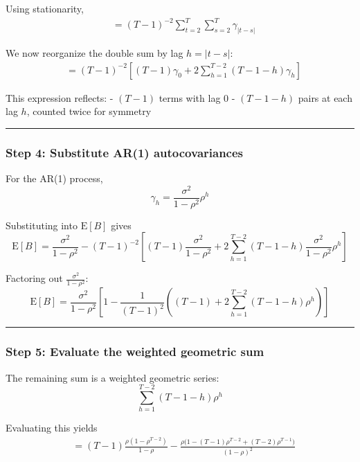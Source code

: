 \documentclass[11pt]{article}
\begin{document}
Using stationarity, \[
\begin{aligned}
&= (T-1)^{-2}\sum_{t=2}^{T}\sum_{s=2}^{T} \gamma_{|t-s|}
\end{aligned}
\]

We now reorganize the double sum by lag \(h = |t-s|\): \[
\begin{aligned}
&= (T-1)^{-2}\left[(T-1)\gamma_0 + 2\sum_{h=1}^{T-2}(T-1-h)\gamma_h\right]
\end{aligned}
\]

This expression reflects: - \((T-1)\) terms with lag 0 - \((T-1-h)\)
pairs at each lag \(h\), counted twice for symmetry

\begin{center}\rule{0.5\linewidth}{0.5pt}\end{center}

\subsubsection{Step 4: Substitute AR(1)
autocovariances}\label{step-4-substitute-ar1-autocovariances}

For the AR(1) process, \[
\gamma_h = \frac{\sigma^2}{1-\rho^2}\rho^h
\]

Substituting into \(\text{E}[B]\) gives \[
\text{E}[B]
=
\frac{\sigma^2}{1-\rho^2}
-
(T-1)^{-2}
\left[
(T-1)\frac{\sigma^2}{1-\rho^2}
+
2\sum_{h=1}^{T-2}(T-1-h)\frac{\sigma^2}{1-\rho^2}\rho^h
\right]
\]

Factoring out \(\frac{\sigma^2}{1-\rho^2}\): \[
\text{E}[B]
=
\frac{\sigma^2}{1-\rho^2}
\left[
1
-
\frac{1}{(T-1)^2}
\left(
(T-1)
+
2\sum_{h=1}^{T-2}(T-1-h)\rho^h
\right)
\right]
\]

\begin{center}\rule{0.5\linewidth}{0.5pt}\end{center}

\subsubsection{Step 5: Evaluate the weighted geometric
sum}\label{step-5-evaluate-the-weighted-geometric-sum}

The remaining sum is a weighted geometric series: \[
\sum_{h=1}^{T-2}(T-1-h)\rho^h
\]

Evaluating this yields \[
\begin{aligned}
&=
(T-1)\frac{\rho(1-\rho^{T-2})}{1-\rho}
-
\frac{\rho\big(1-(T-1)\rho^{T-2}+(T-2)\rho^{T-1}\big)}{(1-\rho)^2}
\end{aligned}
\]
\end{document}
